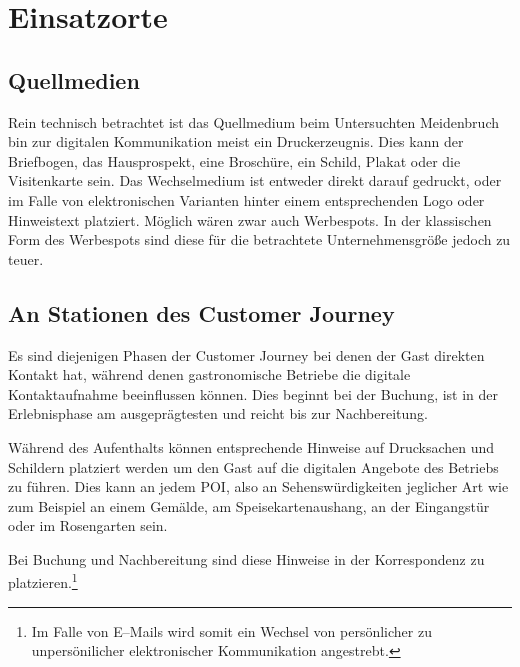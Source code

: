 
\section{Einsatzorte} %
\label{sec:einsatzorte}

\subsection{Quellmedien} %
\label{sub:quellmedien}
Rein technisch betrachtet ist das Quellmedium beim Untersuchten Meidenbruch bin zur digitalen Kommunikation meist ein Druckerzeugnis. Dies kann der Briefbogen, das Hausprospekt, eine Broschüre, ein Schild, Plakat oder die Visitenkarte sein. Das Wechselmedium ist entweder direkt darauf gedruckt, oder im Falle von elektronischen Varianten hinter einem entsprechenden Logo oder Hinweistext platziert. Möglich wären zwar auch Werbespots. In der klassischen Form des Werbespots sind diese für die betrachtete  Unternehmensgröße jedoch zu teuer.


\subsection{An Stationen des Customer Journey} %
\label{sub:stationen_des_customer_journey}
Es sind diejenigen Phasen der Customer Journey bei denen der Gast direkten Kontakt hat, während denen gastronomische Betriebe die digitale Kontaktaufnahme beeinflussen können. Dies beginnt bei der Buchung, ist in der Erlebnisphase am ausgeprägtesten und reicht bis zur Nachbereitung.

Während des Aufenthalts können entsprechende Hinweise auf Drucksachen und Schildern platziert werden um den Gast auf die digitalen Angebote des Betriebs zu führen. Dies kann an jedem \ac{POI}, also an Sehenswürdigkeiten jeglicher Art wie zum Beispiel an einem Gemälde, am Speisekartenaushang, an der Eingangstür oder im Rosengarten sein.

Bei Buchung und Nachbereitung sind diese Hinweise in der Korrespondenz zu platzieren.\footnote{Im Falle von E–Mails wird somit ein Wechsel von persönlicher zu unpersönilicher elektronischer Kommunikation angestrebt.}


